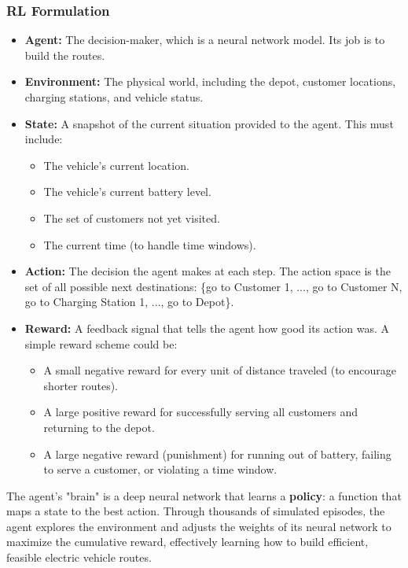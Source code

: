 \documentclass{article}
\begin{document}
\subsubsection{RL Formulation}
\begin{itemize}
    \item{\textbf{Agent:}} The decision-maker, which is a neural network model. Its job is to build the routes.
    \item{\textbf{Environment:}} The physical world, including the depot, customer locations, charging stations, and vehicle status.
    \item{\textbf{State:}} A snapshot of the current situation provided to the agent. This must include:
    \begin{itemize}
        \item The vehicle's current location.
        \item The vehicle's current battery level.
        \item The set of customers not yet visited.
        \item The current time (to handle time windows).
    \end{itemize}
    \item{\textbf{Action:}} The decision the agent makes at each step. The action space is the set of all possible next destinations: \{go to Customer 1, ..., go to Customer N, go to Charging Station 1, ..., go to Depot\}.
    \item{\textbf{Reward:}} A feedback signal that tells the agent how good its action was. A simple reward scheme could be:
    \begin{itemize}
        \item A small negative reward for every unit of distance traveled (to encourage shorter routes).
        \item A large positive reward for successfully serving all customers and returning to the depot.
        \item A large negative reward (punishment) for running out of battery, failing to serve a customer, or violating a time window.
    \end{itemize}
\end{itemize}

The agent's "brain" is a deep neural network that learns a \textbf{policy}: a function that maps a state to the best action. Through thousands of simulated episodes, the agent explores the environment and adjusts the weights of its neural network to maximize the cumulative reward, effectively learning how to build efficient, feasible electric vehicle routes.
\end{document}
